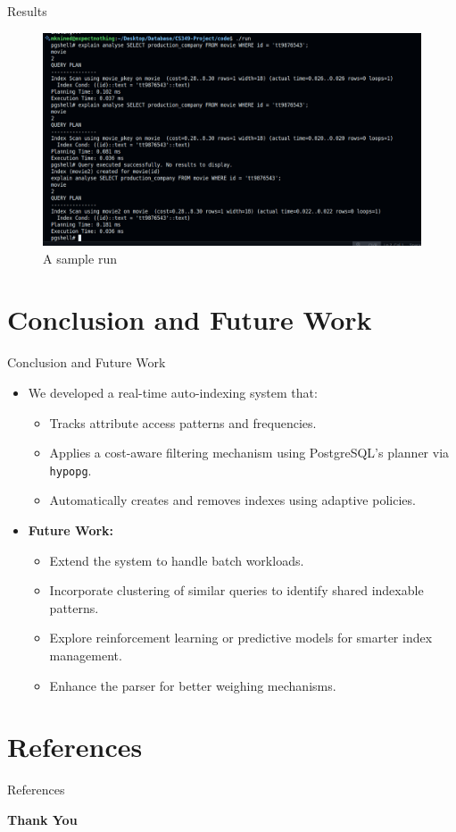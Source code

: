 \documentclass[Serif, 10pt, brown]{beamer}
\theoremstyle{example}
\theoremstyle{plain}
\begin{document}
\begin{frame}{Results}
	\begin{figure}
        \centering
        \includegraphics[width=1\linewidth]{../images/Screenshot from 2025-05-01 11-37-42.png}
        \caption{A sample run}
    \end{figure}
\end{frame}

\section{Conclusion and Future Work}
\begin{frame}{Conclusion and Future Work}
	\begin{itemize}
		\item We developed a real-time auto-indexing system that:
		\begin{itemize}
			\item Tracks attribute access patterns and frequencies.
			\item Applies a cost-aware filtering mechanism using PostgreSQL’s planner via \texttt{hypopg}.
			\item Automatically creates and removes indexes using adaptive policies.
		\end{itemize}
	
		\vspace{0.3cm}
		\item \textbf{Future Work:}
		\begin{itemize}
			\item Extend the system to handle batch workloads.
			\item Incorporate clustering of similar queries to identify shared indexable patterns.
			\item Explore reinforcement learning or predictive models for smarter index management.
			\item Enhance the parser for better weighing mechanisms.
		\end{itemize}
	\end{itemize}
	\end{frame}

\section{References}
\begin{frame}{References}
	
    
\end{frame}

\begin{frame}
    \Huge{\centerline{\bf Thank You}}
\end{frame}
\end{document}
